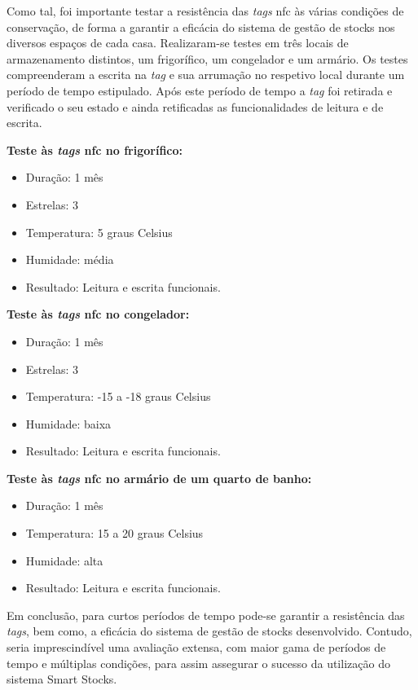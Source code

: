 Como tal, foi importante testar a resistência das \textit{tags} \acrshort{nfc} às várias condições de conservação, de forma a garantir a eficácia do sistema de gestão de stocks nos diversos espaços de cada casa. Realizaram-se testes em três locais de armazenamento distintos, um frigorífico, um congelador e um armário. Os testes compreenderam a escrita na \textit{tag} e sua arrumação no respetivo local durante um período de tempo estipulado. Após este período de tempo a \textit{tag} foi retirada e verificado o seu estado e ainda retificadas as funcionalidades de leitura e de escrita.

\textbf{Teste às \textit{tags} \acrshort{nfc} no frigorífico:}
\begin{itemize}
\addtolength{\itemindent}{0.5cm} 
    \item Duração: 1 mês
    \item Estrelas: 3
    \item Temperatura: 5 graus Celsius
    \item Humidade: média
    \item Resultado: Leitura e escrita funcionais.
\end{itemize}
     
\textbf{Teste às \textit{tags} \acrshort{nfc} no congelador:}
\begin{itemize}
    \addtolength{\itemindent}{0.5cm} 
    \item Duração: 1 mês
    \item Estrelas: 3
    \item Temperatura: -15 a -18 graus Celsius
    \item Humidade: baixa
    \item Resultado: Leitura e escrita funcionais.
\end{itemize}
    
\textbf{Teste às \textit{tags} \acrshort{nfc} no armário de um quarto de banho:}
\begin{itemize}
    \addtolength{\itemindent}{0.5cm} 
    \item Duração: 1 mês
    \item Temperatura: 15 a 20 graus Celsius
    \item Humidade: alta
    \item Resultado: Leitura e escrita funcionais.
\end{itemize}
   
Em conclusão, para curtos períodos de tempo pode-se garantir a resistência das \textit{tags}, bem como, a eficácia do sistema de gestão de stocks desenvolvido. Contudo, seria imprescindível uma avaliação extensa, com maior gama de períodos de tempo e múltiplas condições, para assim assegurar o sucesso da utilização do sistema Smart Stocks.

